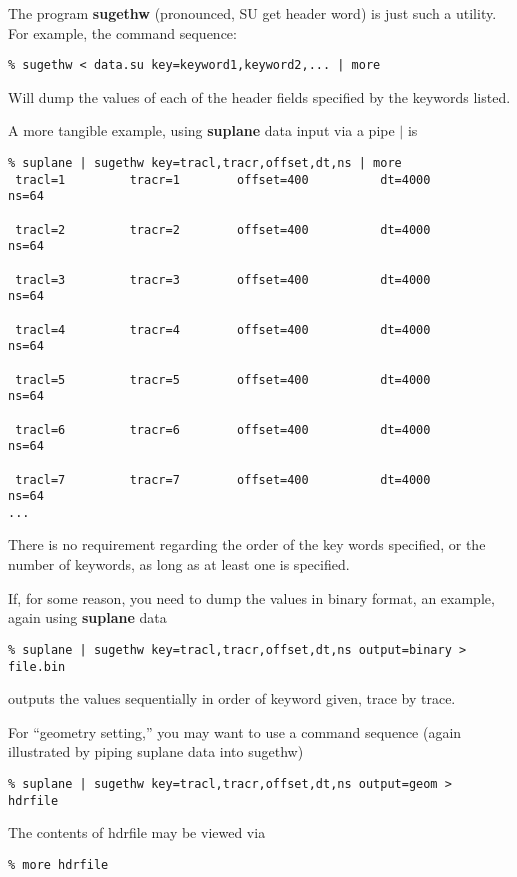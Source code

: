 {{{The program {\bf sugethw\/} (pronounced, SU get header word)
is just such a utility. For example, the command sequence:
{\small\begin{verbatim}
% sugethw < data.su key=keyword1,keyword2,... | more
\end{verbatim} } \noindent
Will dump the values of each of the header fields specified by
the keywords listed.

A more tangible example, using {\bf suplane\/} data input via a pipe $|$
is
{\small\begin{verbatim}
% suplane | sugethw key=tracl,tracr,offset,dt,ns | more
 tracl=1         tracr=1        offset=400          dt=4000         ns=64       

 tracl=2         tracr=2        offset=400          dt=4000         ns=64       

 tracl=3         tracr=3        offset=400          dt=4000         ns=64       

 tracl=4         tracr=4        offset=400          dt=4000         ns=64       

 tracl=5         tracr=5        offset=400          dt=4000         ns=64       

 tracl=6         tracr=6        offset=400          dt=4000         ns=64       

 tracl=7         tracr=7        offset=400          dt=4000         ns=64       
...
\end{verbatim} } \noindent
There is no requirement regarding the order of the key words specified,
or the number of keywords, as long as at least one is specified.

If, for some reason, you need to dump the values in binary format,
an example, again using {\bf suplane\/} data
{\small\begin{verbatim}
% suplane | sugethw key=tracl,tracr,offset,dt,ns output=binary >  file.bin
\end{verbatim} } \noindent
outputs the values sequentially in order of keyword given, trace
by trace.

For ``geometry setting,'' you may want to use a command sequence
(again illustrated by piping suplane data into sugethw)

{\small\begin{verbatim}
% suplane | sugethw key=tracl,tracr,offset,dt,ns output=geom >  hdrfile
\end{verbatim} } \noindent

The contents of  hdrfile may be viewed via
{\small\begin{verbatim}
% more hdrfile


\end{verbatim}}}}}
